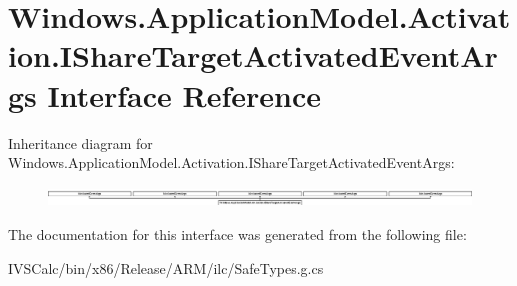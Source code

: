 \hypertarget{interface_windows_1_1_application_model_1_1_activation_1_1_i_share_target_activated_event_args}{}\section{Windows.\+Application\+Model.\+Activation.\+I\+Share\+Target\+Activated\+Event\+Args Interface Reference}
\label{interface_windows_1_1_application_model_1_1_activation_1_1_i_share_target_activated_event_args}
Inheritance diagram for Windows.\+Application\+Model.\+Activation.\+I\+Share\+Target\+Activated\+Event\+Args\+:\begin{figure}[H]
\begin{center}
\leavevmode
\includegraphics[height=0.532067cm]{interface_windows_1_1_application_model_1_1_activation_1_1_i_share_target_activated_event_args}
\end{center}
\end{figure}


The documentation for this interface was generated from the following file\+:\begin{DoxyCompactItemize}
\item 
I\+V\+S\+Calc/bin/x86/\+Release/\+A\+R\+M/ilc/Safe\+Types.\+g.\+cs\end{DoxyCompactItemize}
